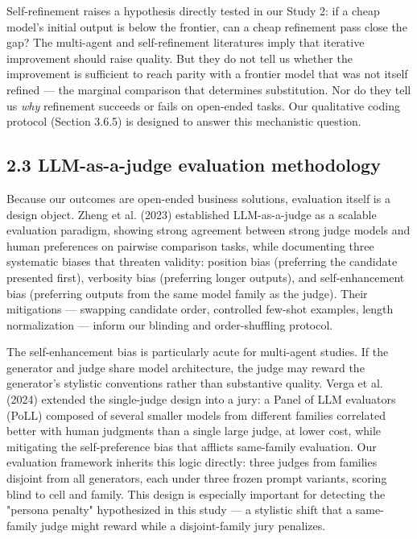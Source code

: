 \documentclass[11pt,a4paper]{article}
\begin{document}
Self-refinement raises a hypothesis directly tested in our Study 2: if a
cheap model's initial output is below the frontier, can a cheap refinement
pass close the gap? The multi-agent and self-refinement literatures imply
that iterative improvement should raise quality. But they do not tell us
whether the improvement is sufficient to reach parity with a frontier model
that was not itself refined — the marginal comparison that determines
substitution. Nor do they tell us \textit{why} refinement succeeds or fails on
open-ended tasks. Our qualitative coding protocol (Section 3.6.5) is
designed to answer this mechanistic question.

\subsection{2.3 LLM-as-a-judge evaluation methodology}

Because our outcomes are open-ended business solutions, evaluation itself is
a design object. Zheng et al. (2023) established LLM-as-a-judge as a
scalable evaluation paradigm, showing strong agreement between strong judge
models and human preferences on pairwise comparison tasks, while documenting
three systematic biases that threaten validity: position bias (preferring
the candidate presented first), verbosity bias (preferring longer outputs),
and self-enhancement bias (preferring outputs from the same model family as
the judge). Their mitigations — swapping candidate order, controlled
few-shot examples, length normalization — inform our blinding and
order-shuffling protocol.

The self-enhancement bias is particularly acute for multi-agent studies. If
the generator and judge share model architecture, the judge may reward the
generator's stylistic conventions rather than substantive quality. Verga et
al. (2024) extended the single-judge design into a jury: a Panel of LLM
evaluators (PoLL) composed of several smaller models from different families
correlated better with human judgments than a single large judge, at lower
cost, while mitigating the self-preference bias that afflicts same-family
evaluation. Our evaluation framework inherits this logic directly: three
judges from families disjoint from all generators, each under three frozen
prompt variants, scoring blind to cell and family. This design is especially
important for detecting the "persona penalty" hypothesized in this study —
a stylistic shift that a same-family judge might reward while a
disjoint-family jury penalizes.
\end{document}
